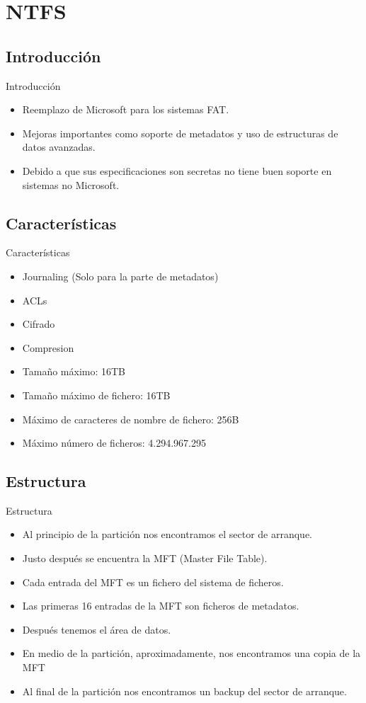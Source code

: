 \section{NTFS}
\subsection{Introducción}
\begin{frame}{Introducción}
  \begin{itemize}
    \item Reemplazo de Microsoft para los sistemas FAT.
    \item Mejoras importantes como soporte de metadatos y uso de estructuras de datos avanzadas.
    \item Debido a que sus especificaciones son secretas no tiene buen soporte en sistemas no Microsoft.
  \end{itemize}
\end{frame}

\subsection{Características}
\begin{frame}{Características}
  \begin{itemize}
    \item Journaling (Solo para la parte de metadatos)
    \item ACLs
    \item Cifrado
    \item Compresion
    \item Tamaño máximo: 16TB
    \item Tamaño máximo de fichero: 16TB
    \item Máximo de caracteres de nombre de fichero: 256B
    \item Máximo número de ficheros: 4.294.967.295
  \end{itemize}
\end{frame}

\subsection{Estructura}
\begin{frame}{Estructura}
  \begin{itemize}
    \item Al principio de la partición nos encontramos el sector de arranque.
    \item Justo después se encuentra la MFT (Master File Table).
    \item Cada entrada del MFT es un fichero del sistema de ficheros.
    \item Las primeras 16 entradas de la MFT son ficheros de metadatos.
    \item Después tenemos el área de datos.
    \item En medio de la partición, aproximadamente, nos encontramos una copia de la MFT
    \item Al final de la partición nos encontramos un backup del sector de arranque.
  \end{itemize}
\end{frame}

